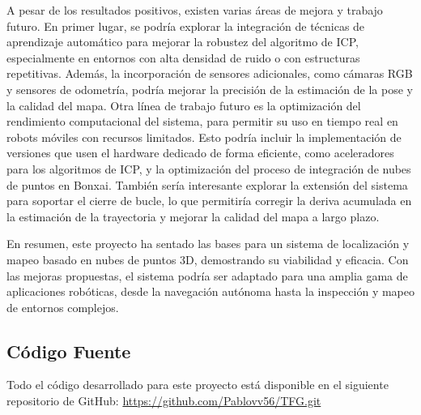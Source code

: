 \documentclass[12pt, a4paper, twoside]{article}
\begin{document}
A pesar de los resultados positivos, existen varias áreas de mejora y trabajo futuro. En primer lugar, se podría explorar la integración de técnicas de aprendizaje automático para mejorar la robustez del
algoritmo de ICP, especialmente en entornos con alta densidad de ruido o con estructuras repetitivas. Además, la incorporación de sensores adicionales, como cámaras RGB y sensores de odometría, 
podría mejorar la precisión de la estimación de la pose y la calidad del mapa.\newline
Otra línea de trabajo futuro es la optimización del rendimiento computacional del sistema, para permitir su uso en tiempo real en robots móviles con recursos limitados. Esto podría incluir la 
implementación de versiones que usen el hardware dedicado de forma eficiente, como aceleradores para los algoritmos de ICP, y la optimización del proceso de integración de nubes de 
puntos en Bonxai\cite{faconti2024bonxai}.\newline
También sería interesante explorar la extensión del sistema para soportar el cierre de bucle, lo que permitiría corregir la deriva acumulada en la estimación de la trayectoria y mejorar la calidad del mapa
a largo plazo.\newline

En resumen, este proyecto ha sentado las bases para un sistema de localización y mapeo basado en nubes de puntos 3D, demostrando su viabilidad y eficacia. Con las mejoras propuestas, el sistema podría
ser adaptado para una amplia gama de aplicaciones robóticas, desde la navegación autónoma hasta la inspección y mapeo de entornos complejos.



\begin{umaappendices}
\section{Código Fuente}
Todo el código desarrollado para este proyecto está disponible en el siguiente repositorio de GitHub\cite{github}: \href{https://github.com/Pablovv56/TFG.git}{https://github.com/Pablovv56/TFG.git}
\end{umaappendices}


\end{document}

